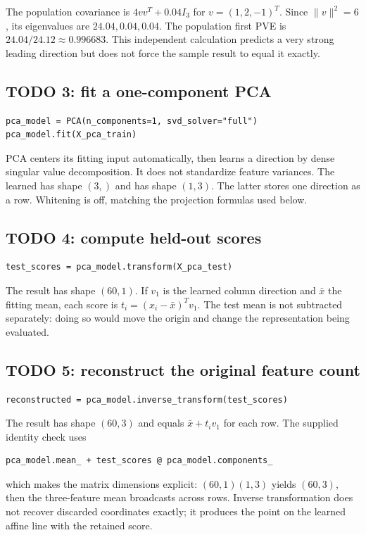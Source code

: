 The population covariance is $4vv^T+0.04I_3$ for $v=(1,2,-1)^T$.
Since $\|v\|^2=6$, its eigenvalues are $24.04,0.04,0.04$.
The population first PVE is $24.04/24.12\approx0.996683$.
This independent calculation predicts a very strong leading direction but does not force the sample result to equal it exactly.

\subsection{TODO 3: fit a one-component PCA}
\begin{lstlisting}
pca_model = PCA(n_components=1, svd_solver="full")
pca_model.fit(X_pca_train)
\end{lstlisting}
PCA centers its fitting input automatically, then learns a direction by dense singular value decomposition.
It does not standardize feature variances. The learned  has shape $(3,)$ and  has shape $(1,3)$.
The latter stores one direction as a row. Whitening is off, matching the projection formulas used below.

\subsection{TODO 4: compute held-out scores}
\begin{lstlisting}
test_scores = pca_model.transform(X_pca_test)
\end{lstlisting}
The result has shape $(60,1)$. If $v_1$ is the learned column direction and $\bar x$ the fitting mean,
each score is $t_i=(x_i-\bar x)^Tv_1$.
The test mean is not subtracted separately: doing so would move the origin and change the representation being evaluated.

\subsection{TODO 5: reconstruct the original feature count}
\begin{lstlisting}
reconstructed = pca_model.inverse_transform(test_scores)
\end{lstlisting}
The result has shape $(60,3)$ and equals $\bar x+t_iv_1$ for each row.
The supplied identity check uses
\begin{lstlisting}
pca_model.mean_ + test_scores @ pca_model.components_
\end{lstlisting}
which makes the matrix dimensions explicit: $(60,1)(1,3)$ yields $(60,3)$, then the three-feature mean broadcasts across rows.
Inverse transformation does not recover discarded coordinates exactly; it produces the point on the learned affine line with the retained score.


